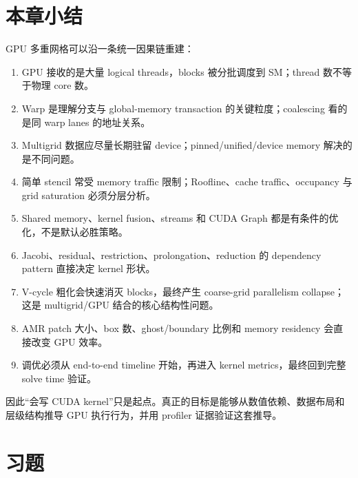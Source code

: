 \section{本章小结}

GPU 多重网格可以沿一条统一因果链重建：

\begin{enumerate}
\item GPU 接收的是大量 logical threads，blocks 被分批调度到 SM；thread 数不等于物理 core 数。
\item Warp 是理解分支与 global-memory transaction 的关键粒度；coalescing 看的是同 warp lanes 的地址关系。
\item Multigrid 数据应尽量长期驻留 device；pinned/unified/device memory 解决的是不同问题。
\item 简单 stencil 常受 memory traffic 限制；Roofline、cache traffic、occupancy 与 grid saturation 必须分层分析。
\item Shared memory、kernel fusion、streams 和 CUDA Graph 都是有条件的优化，不是默认必胜策略。
\item Jacobi、residual、restriction、prolongation、reduction 的 dependency pattern 直接决定 kernel 形状。
\item V-cycle 粗化会快速消灭 blocks，最终产生 coarse-grid parallelism collapse；这是 multigrid/GPU 结合的核心结构性问题。
\item AMR patch 大小、box 数、ghost/boundary 比例和 memory residency 会直接改变 GPU 效率。
\item 调优必须从 end-to-end timeline 开始，再进入 kernel metrics，最终回到完整 solve time 验证。
\end{enumerate}

因此“会写 CUDA kernel”只是起点。真正的目标是能够从数值依赖、数据布局和层级结构推导 GPU 执行行为，并用 profiler 证据验证这套推导。

\section*{习题}

